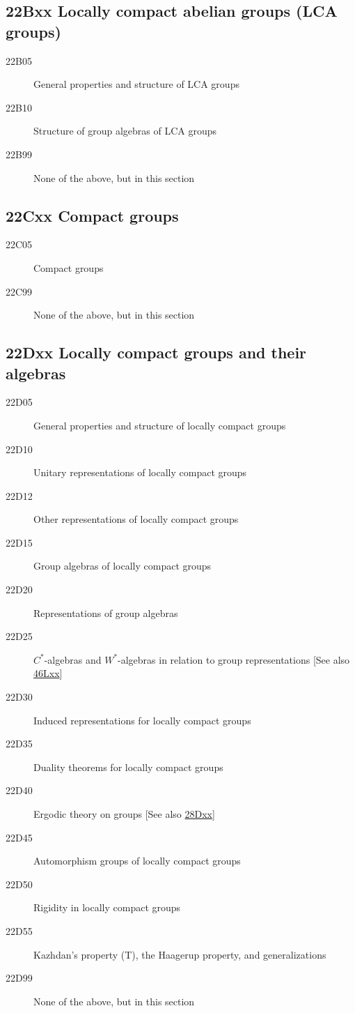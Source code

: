 \subsection*{22Bxx  Locally compact abelian groups (LCA groups) }\label{22Bxx}
\begin{description}  
\item [22B05]\label{22B05} General properties and structure of LCA groups
\item [22B10]\label{22B10} Structure of group algebras of LCA groups
\item [22B99]\label{22B99} None of the above, but in this section
\end{description}
\subsection*{22Cxx  Compact groups }\label{22Cxx}
\begin{description}  
\item [22C05]\label{22C05} Compact groups
\item [22C99]\label{22C99} None of the above, but in this section
\end{description}
\subsection*{22Dxx  Locally compact groups and their algebras }\label{22Dxx}
\begin{description}  
\item [22D05]\label{22D05} General properties and structure of locally compact groups
\item [22D10]\label{22D10} Unitary representations of locally compact groups
\item [22D12]\label{22D12} Other representations of locally compact groups
\item [22D15]\label{22D15} Group algebras of locally compact groups
\item [22D20]\label{22D20} Representations of group algebras
\item [22D25]\label{22D25} $C^*$-algebras and $W^*$-algebras in relation to group representations [See also \hyperref[46Lxx]{46Lxx}]
\item [22D30]\label{22D30} Induced representations for locally compact groups
\item [22D35]\label{22D35} Duality theorems for locally compact groups
\item [22D40]\label{22D40} Ergodic theory on groups [See also \hyperref[28Dxx]{28Dxx}]
\item [22D45]\label{22D45} Automorphism groups of locally compact groups
\item [22D50]\label{22D50} Rigidity in locally compact groups
\item [22D55]\label{22D55} Kazhdan's property (T), the Haagerup property, and generalizations
\item [22D99]\label{22D99} None of the above, but in this section
\end{description}
